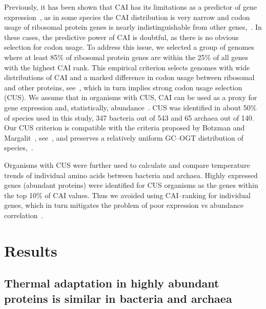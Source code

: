 \documentclass[10pt,letterpaper]{article}
\begin{document}
Previously, it has been shown that CAI has its limitations as a predictor of gene expression~\cite{Botzman2011Variation}, as in some species the CAI distribution is very narrow and codon usage of ribosomal protein genes is nearly indistinguishable from other genes,~. In these cases, the predictive power of CAI is doubtful, as there is no obvious selection for codon usage. To address this issue, we selected a group of genomes where at least 85\% of ribosomal protein genes are within the 25\% of all genes with the highest CAI rank. This empirical criterion selects genomes with wide distributions of CAI and a marked difference in codon usage between ribosomal and other proteins, see~, which in turn implies strong codon usage selection (CUS). We assume that in organisms with CUS, CAI can be used as a proxy for gene expression and, statistically, abundance~\cite{Sharp1987The,Jansen2003Revisiting,Supek2005Comparison,Maier2009Correlation}. CUS was identified in about 50\% of species used in this study, 347 bacteria out of 543 and 65 archaea out of 140. Our CUS criterion is compatible with the criteria proposed by Botzman and Margalit~\cite{Botzman2011Variation}, see~, and preserves a relatively uniform GC--OGT distribution of species,~.

Organisms with CUS were further used to calculate and compare temperature trends of individual amino acids between bacteria and archaea. Highly expressed genes (abundant proteins) were identified for CUS organisms as the genes within the top 10\% of CAI values. Thus we avoided using CAI--ranking for individual genes, which in turn mitigates the problem of poor expression vs abundance correlation~\cite{Maier2009Correlation}.


\section*{Results}

\subsection*{Thermal adaptation in highly abundant proteins is similar in bacteria and archaea}
\end{document}

